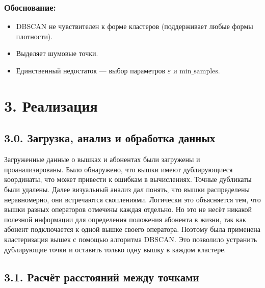 \documentclass[a4paper,14pt]{extarticle}
\begin{document}
\begin{itemize}
    \subsubsection*{Обоснование:}
    \begin{itemize}
        \item DBSCAN не чувствителен к форме кластеров (поддерживает любые формы плотности).
        \item Выделяет шумовые точки.
        \item Единственный недостаток — выбор параметров $\varepsilon$ и $\text{min\_samples}$.
    \end{itemize}



    \section*{3. Реализация}

    \subsection*{3.0. Загрузка, анализ и обработка данных}
    Загруженные данные о вышках и абонентах были загружены и проанализированы. Было обнаружено, что вышки имеют дублирующиеся координаты,
    что может привести к ошибкам в вычислениях. Точные дубликаты были удалены. Далее визуальный анализ дал понять,
    что вышки распределены неравномерно, они встречаются скоплениями. Логически это объясняется тем, что вышки разных
    операторов отмечены каждая отдельно. Но это не несёт никакой полезной информации для определения положения абонента
    в жизни, так как абонент подключается к одной вышке своего оператора. Поэтому была применена кластеризация вышек с помощью алгоритма DBSCAN.
    Это позволило устранить дублирующие точки и оставить только одну вышку в каждом кластере.

    \subsection*{3.1. Расчёт расстояний между точками}


\end{itemize}
\end{document}

